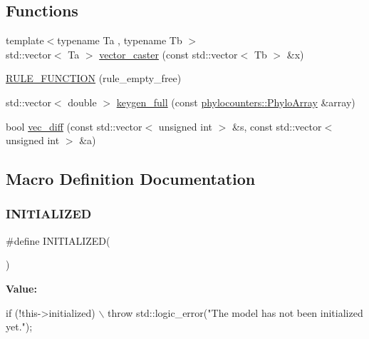 \subsection*{Functions}
\begin{DoxyCompactItemize}
\item 
{\footnotesize template$<$typename Ta , typename Tb $>$ }\\std\+::vector$<$ Ta $>$ \hyperlink{aphylomodel-bones_8hpp_a13c91ee42db6c3b986acbbac4ee58cb0}{vector\+\_\+caster} (const std\+::vector$<$ Tb $>$ \&x)
\item 
\hyperlink{aphylomodel-bones_8hpp_a11c7dd7dca27f32547bb602f30ceb5e8}{R\+U\+L\+E\+\_\+\+F\+U\+N\+C\+T\+I\+ON} (rule\+\_\+empty\+\_\+free)
\item 
std\+::vector$<$ double $>$ \hyperlink{aphylomodel-bones_8hpp_aa60134cca317d64e4b3d1707380d5d0d}{keygen\+\_\+full} (const \hyperlink{namespacebarry_1_1counters_1_1phylo_abd293bf65e494e903639fb5fb2c91604}{phylocounters\+::\+Phylo\+Array} \&array)
\item 
bool \hyperlink{aphylomodel-bones_8hpp_ac4e3e3e3920b3bbde57ac1ed395e9983}{vec\+\_\+diff} (const std\+::vector$<$ unsigned int $>$ \&s, const std\+::vector$<$ unsigned int $>$ \&a)
\end{DoxyCompactItemize}


\subsection{Macro Definition Documentation}
\mbox{\label{aphylomodel-bones_8hpp_a08888c91f4cab1da64c8f8bf10b59c40}} 
\subsubsection{\texorpdfstring{I\+N\+I\+T\+I\+A\+L\+I\+Z\+ED}{INITIALIZED}}
{\footnotesize\ttfamily \#define I\+N\+I\+T\+I\+A\+L\+I\+Z\+ED(\begin{DoxyParamCaption}{ }\end{DoxyParamCaption})}

{\bfseries Value\+:}
\begin{DoxyCode}
\textcolor{keywordflow}{if} (!this->initialized) \(\backslash\)
    throw std::logic\_error(\textcolor{stringliteral}{"The model has not been initialized yet."});
\end{DoxyCode}


